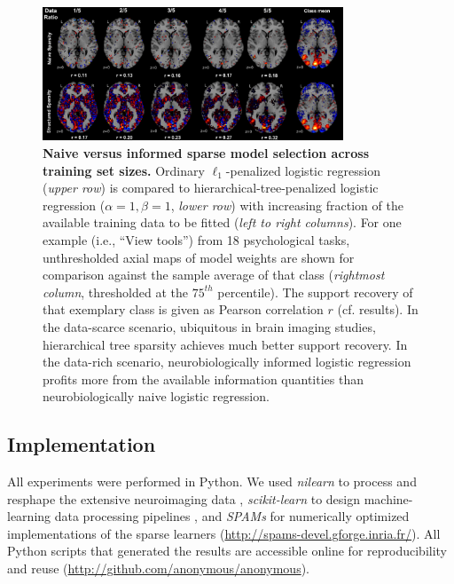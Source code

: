\documentclass{article}
\begin{document}
\begin{figure}
\begin{centering}
\includegraphics[width=0.80\textwidth]{../figures/dataratio_trans.pdf}
\caption{\textbf{Naive versus informed sparse model selection
across training set sizes.}
Ordinary $\ell_1$-penalized logistic regression
(\textit{upper row})
is compared
to hierarchical-tree-penalized logistic regression
($\alpha = 1, \beta = 1$, \textit{lower row})
with increasing fraction
of the available training data
to be fitted (\textit{left to right columns}).
For one example (i.e., ``View tools'') from 18 psychological tasks,
unthresholded axial maps of model weights
are shown for comparison against
the sample average of that class
(\textit{rightmost column}, thresholded at the $75^{th}$ percentile).
The support recovery of that exemplary class is given
as Pearson correlation $r$ (cf. results).
%
In the data-scarce scenario,
ubiquitous in brain imaging studies,
hierarchical tree sparsity achieves much
better support recovery.
%
In the data-rich scenario,
neurobiologically informed logistic regression
profits more from the available information quantities than
neurobiologically naive logistic regression.
}
\label{Tab:fig_dataratio}
\end{centering}
\end{figure}

\subsection{Implementation}
All experiments were performed in Python.
We used \textit{nilearn} to process and resphape
the extensive neuroimaging data 
\cite{abrah14},
\textit{scikit-learn} to design machine-learning
data processing pipelines
\cite{pedr11},
and
\textit{SPAMs} for numerically optimized
implementations of the sparse learners
(\url{http://spams-devel.gforge.inria.fr/}).
All Python scripts that generated the results are
accessible online for reproducibility and reuse
(\url{http://github.com/anonymous/anonymous}).
  
\end{document}
